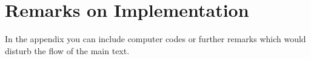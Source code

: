 

\chapter{Remarks on Implementation}
\label{Appendix-Implementation}

In the appendix you can include \eg computer codes or further remarks which would disturb the flow of the main text.


